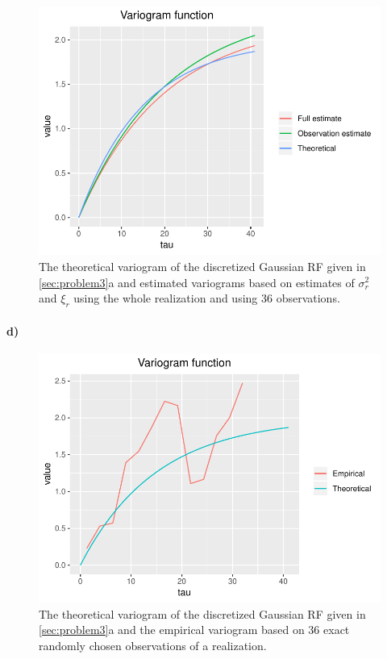 \begin{figure}
    \centering
    \includegraphics[scale=0.95]{figures/3c_variogram_estimates.pdf}
    \caption{The theoretical variogram of the discretized Gaussian RF given in \ref{sec:problem3}a and estimated variograms based on estimates of $\sigma_r^2$ and $\xi_r$ using the whole realization and using 36 observations.}
    \label{fig:3c_variogram_estimates}
\end{figure}

\paragraph{d)}

\begin{figure}
    \centering
    \includegraphics[scale=0.95]{figures/3c_variogram_obs.pdf}
    \caption{The theoretical variogram of the discretized Gaussian RF given in \ref{sec:problem3}a and the empirical variogram based on 36 exact randomly chosen observations of a realization.}
    \label{fig:3c_variogram_obs}
\end{figure}

